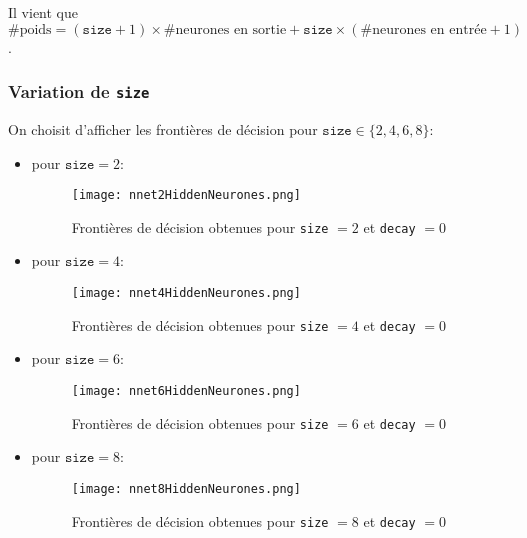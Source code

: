 \documentclass{article}
\begin{document}
\begin{multicols}{2}
Il vient que $\text{\# poids} = (\texttt{size} + 1) \times \text{\# neurones en sortie} + \texttt{size} \times (\text{\# neurones en entrée} + 1)$.

\subsubsection{Variation de \texttt{size}}\label{subsubsec:ex232}

On choisit d'afficher les frontières de décision pour
$\texttt{size} \in \{ 2, 4, 6, 8 \}$:

\begin{itemize} 
    \item pour $\texttt{size} = 2$:
        \begin{figure}[H]
            \begin{center}
                \texttt{[image: nnet2HiddenNeurones.png]}
                \centering
                \captionsetup{justification=centering}
                \caption{\label{fig:nnet2}Frontières de décision obtenues pour \texttt{size} $= 2$ et \texttt{decay} $= 0$}
            \end{center}
        \end{figure}
    \item pour $\texttt{size} = 4$:
        \begin{figure}[H]
            \begin{center}
                \texttt{[image: nnet4HiddenNeurones.png]}
                \centering
                \captionsetup{justification=centering}
                \caption{\label{fig:nnet4}Frontières de décision obtenues pour \texttt{size} $= 4$ et \texttt{decay} $= 0$}
            \end{center}
        \end{figure}
    \item pour $\texttt{size} = 6$:
        \begin{figure}[H]
            \begin{center}
                \texttt{[image: nnet6HiddenNeurones.png]}
                \centering
                \captionsetup{justification=centering}
                \caption{\label{fig:nnet6}Frontières de décision obtenues pour \texttt{size} $= 6$ et \texttt{decay} $= 0$}
            \end{center}
        \end{figure}
    \item pour $\texttt{size} = 8$:
        \begin{figure}[H]
            \begin{center}
                \texttt{[image: nnet8HiddenNeurones.png]}
                \centering
                \captionsetup{justification=centering}
                \caption{\label{fig:nnet8}Frontières de décision obtenues pour \texttt{size} $= 8$ et \texttt{decay} $= 0$}
            \end{center}
        \end{figure}
\end{itemize}


\end{multicols}
\end{document}
